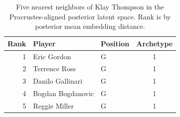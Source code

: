 \begin{table}[htbp]
  \centering\small
  \begin{tabular}{rllc}
    \toprule
    Rank & Player & Position & Archetype \\
    \midrule
    1 & Eric Gordon & G & 1 \\
    2 & Terrence Ross & G & 1 \\
    3 & Danilo Gallinari & G & 1 \\
    4 & Bogdan Bogdanovic & G & 1 \\
    5 & Reggie Miller & G & 1 \\
    \bottomrule
  \end{tabular}
  \caption{Five nearest neighbors of Klay Thompson in the Procrustes-aligned posterior latent space. Rank is by posterior mean embedding distance.}
  \label{tab:Klay_Thompson_neighbors}
\end{table}

